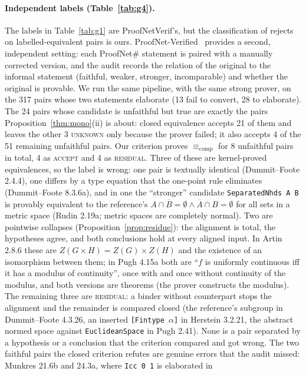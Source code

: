 \documentclass[10pt]{article}
\theoremstyle{definition}
\newcommand{\Ecomp}{\mathrel{\equiv_{\mathrm{comp}}}}
\newcommand{\V}[1]{\textsc{#1}}
\begin{document}
\paragraph{Independent labels (Table~\ref{tab:g4}).} The labels in Table~\ref{tab:g1} are
ProofNetVerif's, but the classification of rejects on labelled-equivalent pairs is ours. ProofNet-Verified~\cite{pnv}
provides a second, independent setting: each ProofNet\# statement is paired with a manually
corrected version, and the audit records the relation of the original to the informal
statement (faithful, weaker, stronger, incomparable) and whether the original is provable.
We run the same pipeline, with the same strong prover, on the 317 pairs whose two statements
elaborate (13 fail to convert, 28 to elaborate). The 24 pairs whose candidate is unfaithful
but true are exactly the pairs Proposition~\ref{thm:mono}(ii) is about: closed equivalence accepts
21 of them and leaves the other 3 \V{unknown} only because the prover failed; it also
accepts 4 of the 51 remaining unfaithful pairs. Our criterion proves $\Ecomp$ for 8 unfaithful
pairs in total, 4 as \V{accept} and 4 as \V{residual}. Three of these are kernel-proved equivalences, so the label is wrong: one pair is
textually identical (Dummit--Foote 2.4.4), one differs by a type equation that the one-point rule
eliminates (Dummit--Foote 8.3.6a), and in one the ``stronger'' candidate \texttt{SeparatedNhds A B}
is provably equivalent to the reference's $A\cap\overline B=\emptyset\wedge\overline A\cap B=\emptyset$
for all sets in a metric space (Rudin 2.19a; metric spaces are completely normal). Two are
pointwise collapses (Proposition~\ref{prop:residue}): the alignment is total, the hypotheses
agree, and both conclusions hold at every aligned input. In Artin 2.8.6 these are
$Z(G\times H)=Z(G)\times Z(H)$ and the existence of an isomorphism between them; in Pugh 4.15a
both are ``$f$ is uniformly continuous iff it has a modulus of continuity'', once with and once
without continuity of the modulus, and both versions are theorems (the prover constructs the
modulus). The remaining three are \V{residual}: a binder without counterpart stops the alignment
and the remainder is compared closed (the reference's subgroup in Dummit--Foote 4.3.26, an inserted
\texttt{[Fintype $\alpha$]} in Herstein 3.2.21, the abstract normed space against
\texttt{EuclideanSpace} in Pugh 2.41). None is a pair separated by a hypothesis or a conclusion that the criterion
compared and got wrong. The two faithful pairs the closed criterion refutes are genuine
errors that the audit missed: Munkres 21.6b and 24.3a, where \texttt{Icc 0 1} is elaborated in
\end{document}

